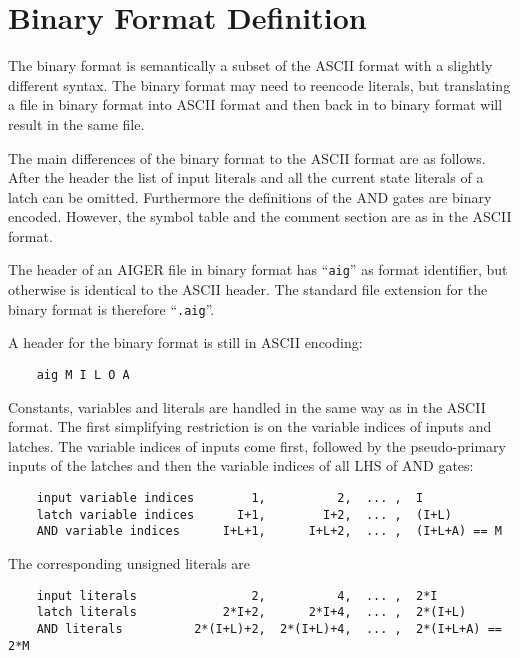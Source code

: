 \documentclass{llncs}
\begin{document}
\section{Binary Format Definition}

  The binary format is semantically a subset of the ASCII format with a
  slightly different syntax.  The binary format may need to reencode
  literals, but translating a file in binary format into ASCII format and
  then back in to binary format will result in the same file.

  The main differences of the binary format to the ASCII format are as
  follows.  After the header the list of input literals and all the
  current state literals of a latch can be omitted.  Furthermore the
  definitions of the AND gates are binary encoded.  However, the symbol
  table and the comment section are as in the ASCII format.

  The header of an AIGER file in binary format has ``\texttt{aig}'' as format
  identifier, but otherwise is identical to the ASCII header.  The standard
  file extension for the binary format is therefore ``\texttt{.aig}''. 
  
  A header for the binary format is still in ASCII encoding:

\begin{verbatim}
    aig M I L O A
\end{verbatim}

  Constants, variables and literals are handled in the same way as in the
  ASCII format.  The first simplifying restriction is on the variable
  indices of inputs and latches.  The variable indices of inputs come first,
  followed by the pseudo-primary inputs of the latches and then the variable
  indices of all LHS of AND gates:

\begin{verbatim}
    input variable indices        1,          2,  ... ,  I
    latch variable indices      I+1,        I+2,  ... ,  (I+L)
    AND variable indices      I+L+1,      I+L+2,  ... ,  (I+L+A) == M
\end{verbatim}

  The corresponding unsigned literals are

\begin{verbatim}
    input literals                2,          4,  ... ,  2*I
    latch literals            2*I+2,      2*I+4,  ... ,  2*(I+L)
    AND literals          2*(I+L)+2,  2*(I+L)+4,  ... ,  2*(I+L+A) == 2*M
\end{verbatim}
                    
\end{document}
